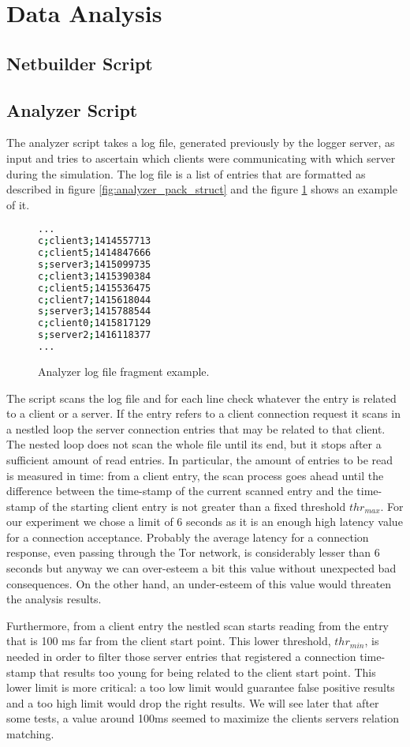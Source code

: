 \section{Data Analysis}
\subsection{Netbuilder Script}
\subsection{Analyzer Script}
The analyzer script takes a log file, generated previously by the logger
server, as input and tries to
ascertain which clients were communicating with which server during the
simulation. The log file is a list of entries that are formatted as described in
 figure \ref{fig:analyzer_pack_struct} and the figure
\ref{fig:example_log_file} shows an example of it.
\begin{figure}[H]
\centering
\begin{lstlisting}[language=bash,frame=single]
...
c;client3;1414557713
c;client5;1414847666
s;server3;1415099735
c;client3;1415390384
c;client5;1415536475
c;client7;1415618044
s;server3;1415788544
c;client0;1415817129
s;server2;1416118377
...
\end{lstlisting}
\caption{Analyzer log file fragment example.}
\label{fig:example_log_file}
\end{figure}
The script scans the log file and for each line check whatever the entry is
related to a client or a server. If the entry refers to a client
connection request it scans in a nestled loop the server connection entries
that may be related to that client. The nested loop does not scan the whole
file until its end, but it stops after a sufficient amount of
read entries. In particular, the amount of entries to be read is
measured in time: from a client entry, the scan process goes
ahead until the difference between the time-stamp of the current scanned 
entry and the time-stamp of the starting client entry is not greater
than a fixed threshold $thr_{max}$. For our experiment we chose a limit of 6
seconds as it is an enough high latency
value for a connection acceptance. Probably the average latency for a
connection response, even passing through the Tor network, is
considerably lesser than 6 seconds but anyway we can over-esteem a bit this
value without unexpected bad consequences. On the other hand, an under-esteem of
this value would threaten the analysis results. 

Furthermore, from a client
entry the nestled scan starts reading from the entry that is 100 ms far
from the client start point. This lower threshold, $thr_{min}$, is needed in order to
 filter those server entries that registered a connection time-stamp
that results too young for being related to the client start point. This
lower limit is more critical: a too low limit would guarantee false
positive results and a too high limit would drop the right results.
We will see later that after some tests, a value around 100ms seemed to maximize 
the clients servers relation matching. %

